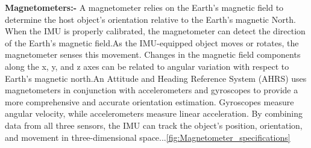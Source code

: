 \textbf{Magnetometers:-}
A magnetometer relies on the Earth’s magnetic field to determine the host object’s orientation relative to the Earth’s magnetic North. When the IMU is properly calibrated, the magnetometer can detect the direction of the Earth’s magnetic field.As the IMU-equipped object moves or rotates, the magnetometer senses this movement. Changes in the magnetic field components along the x, y, and z axes can be related to angular variation with respect to Earth’s magnetic north.An Attitude and Heading Reference System (AHRS) uses magnetometers in conjunction with accelerometers and gyroscopes to provide a more comprehensive and accurate orientation estimation. Gyroscopes measure angular velocity, while accelerometers measure linear acceleration. By combining data from all three sensors, the IMU can track the object’s position, orientation, and movement in three-dimensional space.\cite{221e:2025}..\ref{fig:Magnetometer_specifications}


